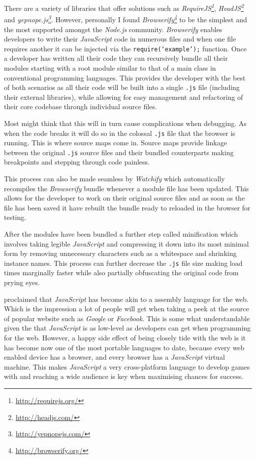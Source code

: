 \documentclass[final]{cmpreport}
\begin{document}
There are a variety of libraries that offer solutions such as \textit{RequireJS\footnote{\url{http://requirejs.org/}}}, \textit{HeadJS\footnote{\url{http://headjs.com/}}} and \textit{yepnope.js\footnote{\url{http://yepnopejs.com/}}}. However, personally I found \textit{Browserify\footnote{\url{http://browserify.org/}}} to be the simplest and the most supported amongst the \textit{Node.js} community. \textit{Browserify} enables developers to write their \textit{JavaScript} code in numerous files and when one file requires another it can be injected via the \texttt{require(`example');} function. Once a developer has written all their code they can recursively bundle all their modules starting with a root module similar to that of a main class in conventional programming languages. This provides the developer with the best of both scenarios as all their code will be built into a single \texttt{.js} file (including their external libraries), while allowing for easy management and refactoring of their core codebase through individual source files.

Most might think that this will in turn cause complications when debugging. As when the code breaks it will do so in the colossal \texttt{.js} file that the browser is running. This is where source maps come in. Source maps provide linkage between the original \texttt{.js} source files and their bundled counterparts making breakpoints and stepping through code painless. \cite{Seddon}

This process can also be made seamless by \textit{Watchify} which automatically recompiles the \textit{Browserify} bundle whenever a module file has been updated. This allows for the developer to work on their original source files and as soon as the file has been saved it have rebuilt the bundle ready to reloaded in the browser for testing.

After the modules have been bundled a further step called minification which involves taking legible \textit{JavaScript} and compressing it down into its most minimal form by removing unnecessary characters such as a whitespace and shrinking instance names. This process can further decrease the \texttt{.js} file size making load times marginally faster while also partially obfuscating the original code from prying eyes.

\cite{Hanselman} proclaimed that \textit{JavaScript} has become akin to a assembly language for the web. Which is the impression a lot of people will get when taking a peek at the source of popular website such as \textit{Google} or \textit{Facebook}. This is some what understandable given the that \textit{JavaScript} is as low-level as developers can get when programming for the web. However, a happy side effect of being closely tide with the web is it has become now one of the most portable languages to date, because every web enabled device has a browser, and every browser has a \textit{JavaScript} virtual machine. This makes \textit{JavaScript} a very cross-platform language to develop games with and reaching a wide audience is key when maximising chances for success.
\end{document}
